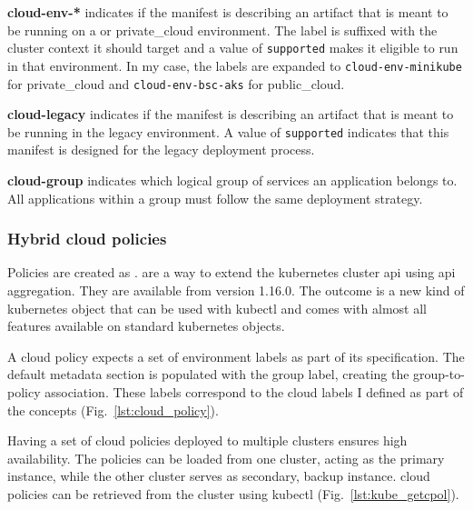 \documentclass[../main.tex]{subfiles}
\begin{document}
    \textbf{cloud-env-*} indicates if the manifest is describing an artifact that is meant to be running on a  or \gls{private_cloud} environment.
    The label is suffixed with the cluster context it should target and a value of \verb|supported| makes it eligible to run in that environment.
    In my case, the labels are expanded to \verb|cloud-env-minikube| for \gls{private_cloud} and \verb|cloud-env-bsc-aks| for \gls{public_cloud}.

    \textbf{cloud-legacy} indicates if the manifest is describing an artifact that is meant to be running in the legacy environment.
    A value of \verb|supported| indicates that this manifest is designed for the legacy deployment process.

    \textbf{cloud-group} indicates which logical group of services an application belongs to.
    All applications within a group must follow the same deployment strategy.

    

    \subsubsection{Hybrid cloud policies}

    Policies are created as .
     are a way to extend the \gls{kubernetes} cluster \acrshort{api} using \acrshort{api} aggregation.
    They are available from version 1.16.0.
    The outcome is a new kind of \gls{kubernetes} object that can be used with \gls{kubectl} and comes with almost all features available on standard \gls{kubernetes} objects.\cite{k8s_crd}

    A \gls{cloud} policy expects a set of environment labels as part of its specification.
    The default metadata section is populated with the group label, creating the group-to-policy association.
    These labels correspond to the \gls{cloud} labels I defined as part of the concepts (Fig.~\ref{lst:cloud_policy}).

    

    Having a set of \gls{cloud} policies deployed to multiple clusters ensures high availability.
    The policies can be loaded from one cluster, acting as the primary instance, while the other cluster serves as secondary, backup instance.
    \Gls{cloud} policies can be retrieved from the cluster using \gls{kubectl} (Fig.~\ref{lst:kube_getcpol}).

    
\end{document}
